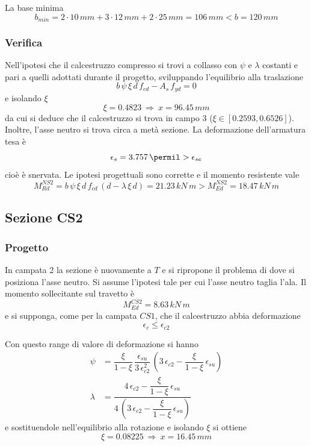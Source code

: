 La base minima
\[
b_{min} = 2\cdot 10\,mm + 3\cdot 12\,mm + 2\cdot 25\,mm = 106\,mm < b = 120\,mm
\]

\subsubsection{Verifica}
Nell'ipotesi che il calcestruzzo compresso si trovi a collasso con $\psi$ e $\lambda$ costanti e pari a quelli adottati durante il progetto, sviluppando l'equilibrio alla traslazione
\[
b\,\psi\,\xi\,d\,f_{cd} - A_s\,f_{yd} = 0
\]
e isolando $\xi$
\[
    \xi = 0.4823~\Longrightarrow~x = 96.45\,mm
\]
da cui si deduce che il calcestruzzo si trova in campo 3 ($\xi\in [0.2593, 0.6526]$). Inoltre, l'asse neutro si trova circa a metà sezione. La deformazione dell'armatura tesa è
\[
\epsilon_s = 3.757\,\permil > \epsilon_{se}
\]
cioè è snervata. Le ipotesi progettuali sono corrette e il momento resistente vale
\begin{equation}
	M_{Rd}^{NS2} = b\,\psi\,\xi\,d\,f_{cd}\,\left(d - \lambda\,\xi\,d\right) = 21.23\,kN\,m > M_{Ed}^{NS2} = 18.47\,kN\,m
\end{equation}

\subsection{Sezione CS2}
\subsubsection{Progetto}
In campata 2 la sezione è nuovamente a $T$ e si ripropone il problema di dove si posiziona l'asse neutro. Si assume l'ipotesi tale per cui l'asse neutro taglia l'ala. Il momento sollecitante sul travetto è
\[
M_{Ed}^{CS2} = 8.63\,kN\,m
\]
e si supponga, come per la campata $CS1$, che il calcestruzzo abbia deformazione 
\[
\epsilon_c \leq \epsilon_{c2}
\]

Con questo range di valore di deformazione si hanno
\begin{align*}
	\psi &= \dfrac{\xi}{1-\xi}\,\dfrac{\epsilon_{su}}{3\,\epsilon_{c2}^2}\,\left(3\,\epsilon_{c2} - \dfrac{\xi}{1-\xi}\,\epsilon_{su}\right)\\
	\lambda &= \dfrac{4\,\epsilon_{c2} - \dfrac{\xi}{1-\xi}\,\epsilon_{su}}{4\,\left(3\,\epsilon_{c2}-\dfrac{\xi}{1-\xi}\,\epsilon_{su}\right)}
\end{align*}
e sostituendole nell'equilibrio alla rotazione e isolando $\xi$ si ottiene
\[
\xi = 0.08225~\Longrightarrow~x = 16.45\,mm
\]

